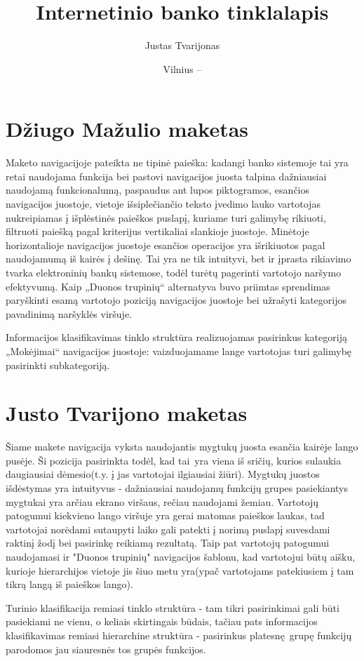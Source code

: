 \documentclass{VUMIFPSkursinis}
\title{Internetinio banko tinklalapis}
\author{Justas Tvarijonas}
\date{Vilnius – \the\year}
\begin{document}
\maketitle
\tableofcontents
\section{Džiugo Mažulio maketas}
Maketo navigacijoje pateikta ne tipinė paieška: kadangi banko sistemoje tai yra retai naudojama funkcija bei pastovi navigacijos juosta talpina dažniausiai naudojamą funkcionalumą, paspaudus ant lupos piktogramos, esančios navigacijos juostoje, vietoje išsiplečiančio teksto įvedimo lauko vartotojas nukreipiamas į išplėstinės paieškos puslapį, kuriame turi galimybę rikiuoti, filtruoti paiešką pagal kriterijus vertikaliai slankioje juostoje. Minėtoje horizontalioje navigacijos juostoje esančios operacijos yra išrikiuotos pagal naudojamumą iš kairės į dešinę. Tai yra ne tik intuityvi, bet ir įprasta rikiavimo tvarka elektroninių bankų sistemose, todėl turėtų pagerinti vartotojo naršymo efektyvumą. Kaip „Duonos trupinių“ alternatyva buvo priimtas sprendimas paryškinti esamą vartotojo poziciją navigacijos juostoje bei užrašyti kategorijos pavadinimą naršyklės viršuje. \par Informacijos klasifikavimas tinklo struktūra realizuojamas pasirinkus kategoriją „Mokėjimai“ navigacijos juostoje: vaizduojamame lange vartotojas turi galimybę pasirinkti subkategoriją.

\section{Justo Tvarijono maketas}
Šiame makete navigacija vyksta naudojantis mygtukų juosta esančia kairėje lango pusėje. Ši pozicija pasirinkta todėl, kad tai yra viena iš sričių, kurios sulaukia daugiausiai dėmesio(t.y. į jas vartotojai ilgiausiai žiūri). Mygtukų juostos išdėstymas yra intuityvus - dažniausiai naudojamų funkcijų grupes pasiekiantys mygtukai yra arčiau ekrano viršaus, rečiau naudojami žemiau. Vartotojų patogumui kiekvieno lango viršuje yra gerai matomas paieškos laukas, tad vartotojai norėdami sutaupyti laiko gali patekti į norimą puslapį suvesdami raktinį žodį bei pasirinkę reikiamą rezultatą. Taip pat vartotojų patogumui naudojamasi ir "Duonos trupinių" navigacijos šablonu, kad vartotojui būtų aišku, kurioje hierarchijos vietoje jis šiuo metu yra(ypač vartotojams patekiusiem į tam tikrą langą iš paieškos lango). \par Turinio klasifikacija remiasi tinklo struktūra - tam tikri pasirinkimai gali būti pasiekiami ne vienu, o keliais skirtingais būdais, tačiau pats informacijos klasifikavimas remiasi hierarchine struktūra - pasirinkus platesnę grupę funkcijų parodomos jau siauresnės tos grupės funkcijos.
\end{document}
